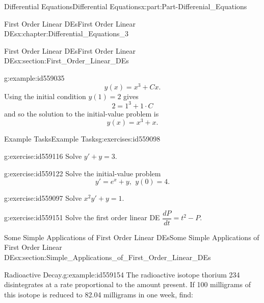 \documentclass[oneside,10pt,]{book}
\numberwithin{equation}{section}
\begin{document}
\begin{partptx}{Differential Equations}{}{Differential Equations}{}{}{x:part:Part-Differenial_Equations}
\begin{chapterptx}{First Order Linear DEs}{}{First Order Linear DEs}{}{}{x:chapter:Differential_Equations_3}
\begin{sectionptx}{First Order Linear DEs}{}{First Order Linear DEs}{}{}{x:section:First_Order_Linear_DEs}
\begin{example}{}{g:example:id559035}
\begin{equation*}
y(x) = x^3 + Cx\text{.}
\end{equation*}
Using the initial condition \(y(1) = 2\) gives%
\begin{equation*}
2 = 1^3 +1 \cdot C
\end{equation*}
and so the solution to the initial-value problem is%
\begin{equation*}
y(x) = x^3 + x\text{.}
\end{equation*}
%
\end{example}
%
%
\typeout{************************************************}
\typeout{************************************************}
%
\begin{exercises-subsection-numberless}{Example Tasks}{}{Example Tasks}{}{}{g:exercises:id559098}
\begin{divisionexercise}{1}{}{}{g:exercise:id559116}%
Solve \(y' + y = 3\).%
\end{divisionexercise}%
\begin{divisionexercise}{2}{}{}{g:exercise:id559122}%
Solve the initial-value problem%
\begin{equation*}
y' = e^x + y, \: \, y(0) = 4\text{.}
\end{equation*}
%
\end{divisionexercise}%
\begin{divisionexercise}{3}{}{}{g:exercise:id559097}%
Solve \(x^2y' + y = 1\).%
\end{divisionexercise}%
\begin{divisionexercise}{4}{}{}{g:exercise:id559151}%
Solve the first order linear DE \(\dfrac{dP}{dt} = t^2 - P\).%
\end{divisionexercise}%
\end{exercises-subsection-numberless}
\end{sectionptx}
%
%
\typeout{************************************************}
\typeout{************************************************}
%
\begin{sectionptx}{Some Simple Applications of First Order Linear DEs}{}{Some Simple Applications of First Order Linear DEs}{}{}{x:section:Simple_Applications_of_First_Order_Linear_DEs}
\begin{example}{Radioactive Decay.}{g:example:id559154}%
The radioactive isotope thorium 234 disintegrates at a rate proportional to the amount present. If 100 milligrams of this isotope is reduced to 82.04 milligrams in one week, find: %

\end{example}
\end{sectionptx}
\end{chapterptx}
\end{partptx}
\end{document}
